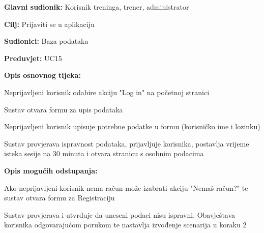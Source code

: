 				\noindent {}				\begin{packed_item}
						
						\item \textbf{Glavni sudionik: }Korisnik treninga, trener, administrator
						\item  \textbf{Cilj:} Prijaviti se u aplikaciju
						\item  \textbf{Sudionici:} Baza podataka
						\item  \textbf{Preduvjet:} UC15
						\item  \textbf{Opis osnovnog tijeka:}
						
						\item \begin{packed_enum}

							\item  Neprijavljeni korisnik odabire akciju "Log in" na početnoj stranici
							\item Sustav otvara formu za upis podataka
							\item Neprijavljeni korisnik upisuje potrebne podatke u formu (korisničko ime i lozinku)
							\item Sustav provjerava ispravnost podataka, prijavljuje korisnika, postavlja vrijeme isteka sesije na 30 minuta i otvara stranicu s osobnim podacima

							
						\end{packed_enum}
						
						\item  \textbf{Opis mogućih odstupanja:}
						
						\begin{packed_enum}
							
							\item[1.a] Ako neprijavljeni korisnik nema račun može izabrati akciju "Nemaš račun?" te sustav otvara formu za Registraciju
							\item[3.a] Sustav provjerava i utvrđuje da uneseni podaci nisu ispravni. Obavještava korisnika odgovarajućom porukom te nastavlja izvođenje scenarija u koraku 2
							
						\end{packed_enum}
						
					\end{packed_item}
				   
